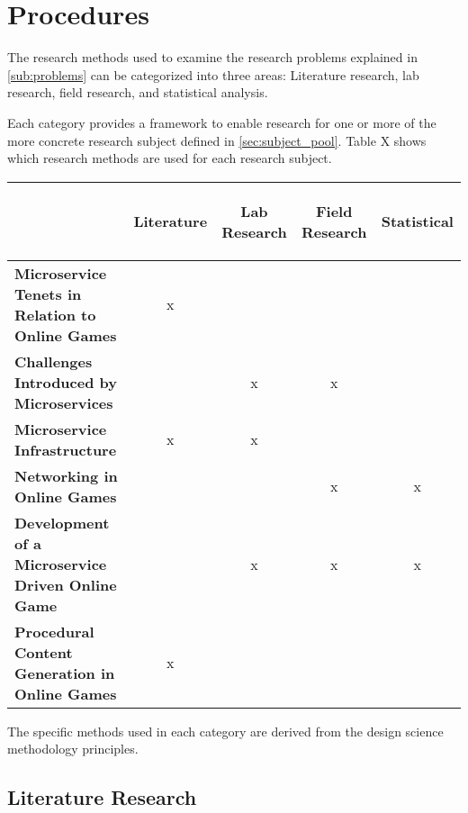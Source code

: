 \section{Procedures}

The research methods used to examine the research problems explained in
\autoref{sub:problems} can be categorized into three areas: Literature
research, lab research, field research, and statistical analysis.

Each category provides a framework to enable research for one or more of the
more concrete research subject defined in \autoref{sec:subject_pool}. Table X
shows which research methods are used for each research subject.

\begin{center}
  \begin{tabular}{ l | c | c | c | c | }
  
  	&\begin{turn}{90}\textbf{Literature}\end{turn}
  	&\begin{turn}{90}\textbf{Lab Research}\end{turn}
  	&\begin{turn}{90}\textbf{Field Research}\end{turn}
  	&\begin{turn}{90}\textbf{Statistical}\end{turn}
  	\\\hline
    
    
    \textbf{Microservice Tenets in Relation to Online Games}&x&&&\\\hline
    \textbf{Challenges Introduced by Microservices}&&x&x&\\\hline
    \textbf{Microservice Infrastructure}&x&x&&\\\hline
    \textbf{Networking in Online Games}&&&x&x\\\hline
    \textbf{Development of a Microservice Driven Online Game}&&x&x&x\\\hline
    \textbf{Procedural Content Generation in Online Games}&x&&&\\\hline
  \end{tabular}
\end{center}

The specific methods used in each category are derived from the design
science methodology principles\cite{wieringa2014design_science}.

\subsection{Literature Research}

